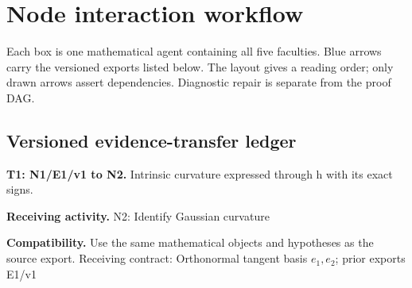 \documentclass[preprint,12pt,aps,pra,showkeys,amsmath,amssymb,superscriptaddress,floatfix]{revtex4-2}
\theoremstyle{definition}
\theoremstyle{remark}
\newcommand{\field}[2]{\par\smallskip\noindent\textbf{#1.} #2\par}
\begin{document}
\clearpage\section{Node interaction workflow}

\begin{center}\end{center}

Each box is one mathematical agent containing all five faculties. Blue
arrows carry the versioned exports listed below. The layout gives a
reading order; only drawn arrows assert dependencies. Diagnostic repair
is separate from the proof DAG.

\subsection{Versioned evidence-transfer ledger}

\begingroup\small\linespread{1.05}\selectfont

\field{T1: N1/E1/v1 to N2}{Intrinsic curvature expressed through h with its exact signs.}

\field{Receiving activity}{N2: Identify Gaussian curvature}

\field{Compatibility}{Use the same mathematical objects and hypotheses as the source export.
Receiving contract: Orthonormal tangent basis \(e_{1},e_{2}\); prior
exports E1/v1}
\end{document}
